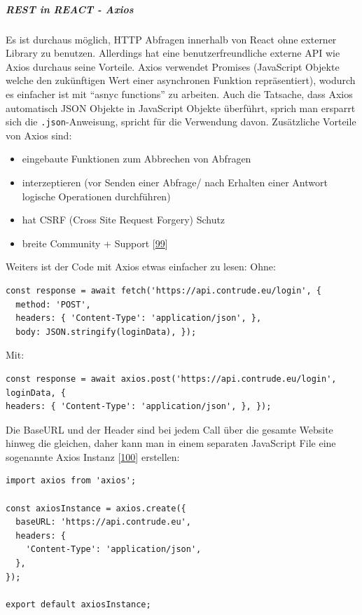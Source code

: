 \documentclass[
    headings=optiontotocandhead,%
    twoside,
    numbers=noenddot,%
    12pt, %
    titlepage, %
    parskip=full, %
    listof=leveldown, 
    numbers=noenddot, %
    a4paper,DIV=14,
    BCOR=15mm,
]{scrbook}
\newcommand{\passthrough}[1]{#1}
\providecommand{\tightlist}{%
  \setlength{\itemsep}{0pt}\setlength{\parskip}{0pt}}
\begin{document}
\hypertarget{rest-in-react---axios}{%
\subparagraph{REST in REACT - Axios}\label{rest-in-react---axios}}

Es ist durchaus möglich, HTTP Abfragen innerhalb von React ohne externer
Library zu benutzen. Allerdings hat eine benutzerfreundliche externe API
wie Axios durchaus seine Vorteile. Axios verwendet Promises (JavaScript
Objekte welche den zukünftigen Wert einer asynchronen Funktion
repräsentiert), wodurch es einfacher ist mit ``asnyc functions'' zu
arbeiten. Auch die Tatsache, dass Axios automatisch JSON Objekte in
JavaScript Objekte überführt, sprich man ersparrt sich die
\passthrough{\lstinline!.json!}-Anweisung, spricht für die Verwendung
davon. Zusätzliche Vorteile von Axios sind:

\begin{itemize}
\tightlist
\item
  eingebaute Funktionen zum Abbrechen von Abfragen
\item
  interzeptieren (vor Senden einer Abfrage/ nach Erhalten einer Antwort
  logische Operationen durchführen)
\item
  hat CSRF (Cross Site Request Forgery) Schutz
\item
  breite Community + Support
  {[}\protect\hyperlink{ref-GeeksForGeeks-Axios}{99}{]}
\end{itemize}

Weiters ist der Code mit Axios etwas einfacher zu lesen: Ohne:

\begin{lstlisting}[caption={Beispiel REST Call mit fetch-api}]
const response = await fetch('https://api.contrude.eu/login', { 
  method: 'POST', 
  headers: { 'Content-Type': 'application/json', }, 
  body: JSON.stringify(loginData), });
\end{lstlisting}

Mit:

\begin{lstlisting}[caption={Beispiel REST Call mit Axios}]
const response = await axios.post('https://api.contrude.eu/login', loginData, { 
headers: { 'Content-Type': 'application/json', }, });
\end{lstlisting}

Die BaseURL und der Header sind bei jedem Call über die gesamte Website
hinweg die gleichen, daher kann man in einem separaten JavaScript File
eine sogenannte Axios Instanz
{[}\protect\hyperlink{ref-gpt-AxiosVT}{100}{]} erstellen:

\begin{lstlisting}[caption={Axios Instanz}]
import axios from 'axios';

const axiosInstance = axios.create({
  baseURL: 'https://api.contrude.eu',
  headers: {
    'Content-Type': 'application/json',
  },
});

export default axiosInstance;
\end{lstlisting}
\end{document}
